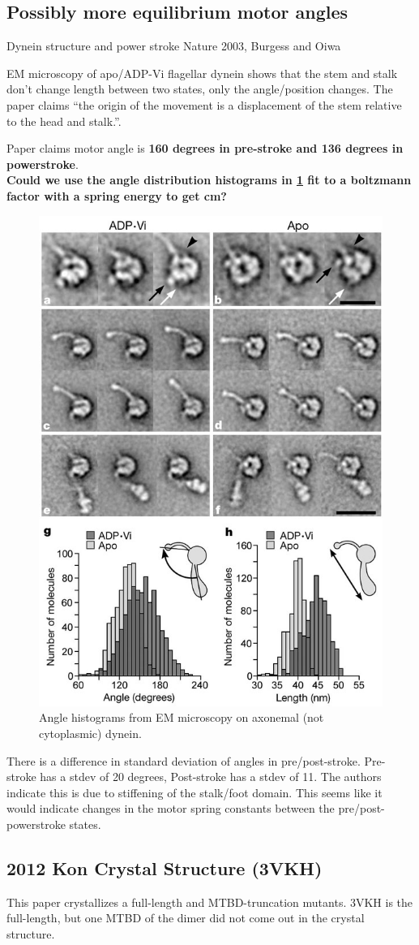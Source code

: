 \documentclass[10pt]{article} %
\begin{document}
\subsection{Possibly more equilibrium motor angles}
Dynein structure and power stroke
Nature 2003, Burgess and Oiwa

EM microscopy of apo/ADP-Vi flagellar dynein shows that the stem and stalk don't change length between two states, only the angle/position changes. The paper claims ``the origin of the movement is a displacement of the stem relative to the head and stalk.''.

Paper claims motor angle is \textbf{160 degrees in pre-stroke and 136 degrees in powerstroke}.\\

\textbf{Could we use the angle distribution histograms in \ref{fig:EM-angles-burgess} fit to a boltzmann factor with a spring energy to get cm?}

\begin{figure}[h!]
  \centering
  \includegraphics[width=.45\textwidth]{../figures/axonemal-motor-angles.jpg}
  \caption{Angle histograms from EM microscopy on axonemal (not cytoplasmic) dynein.}
  \label{fig:EM-angles-burgess}
\end{figure}


There is a difference in standard deviation of angles in pre/post-stroke. Pre-stroke has a stdev of 20 degrees, Post-stroke has a stdev of 11. The authors indicate this is due to stiffening of the stalk/foot domain. This seems like it would indicate changes in the motor spring constants between the pre/post-powerstroke states.

\subsection{2012 Kon Crystal Structure (3VKH)}
This paper crystallizes a full-length and MTBD-truncation mutants. 3VKH is the full-length, but one MTBD of the dimer did not come out in the crystal structure.
\end{document}
